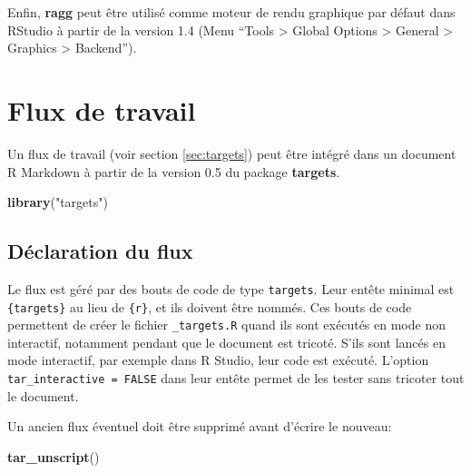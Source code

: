 \documentclass[
  12pt,
  french,
  a4paper,
  extrafontsizes,onecolumn,openright
  ]{memoir}
\newenvironment{Shaded}{\begin{snugshade}}{\end{snugshade}}
\newcommand{\KeywordTok}[1]{\textcolor[rgb]{0.13,0.29,0.53}{\textbf{#1}}}
\newcommand{\NormalTok}[1]{#1}
\newcommand{\StringTok}[1]{\textcolor[rgb]{0.31,0.60,0.02}{#1}}
\begin{document}
\normalsize

Enfin, \textbf{ragg} peut être utilisé comme moteur de rendu graphique par défaut dans RStudio à partir de la version 1.4 (Menu \enquote{Tools \textgreater{} Global Options \textgreater{} General \textgreater{} Graphics \textgreater{} Backend}).

\hypertarget{sec:targetsmd}{%
\section{Flux de travail}\label{sec:targetsmd}}

Un flux de travail (voir section \ref{sec:targets}) peut être intégré dans un document R Markdown à partir de la version 0.5 du package \textbf{targets}.

\scriptsize

\begin{Shaded}
\begin{Highlighting}[]
\KeywordTok{library}\NormalTok{(}\StringTok{"targets"}\NormalTok{)}
\end{Highlighting}
\end{Shaded}

\normalsize

\hypertarget{duxe9claration-du-flux}{%
\subsection{Déclaration du flux}\label{duxe9claration-du-flux}}

Le flux est géré par des bouts de code de type \texttt{targets}.
Leur entête minimal est \texttt{\{targets\}} au lieu de \texttt{\{r\}}, et ils doivent être nommés.
Ces bouts de code permettent de créer le fichier \texttt{\_targets.R} quand ils sont exécutés en mode non interactif, notamment pendant que le document est tricoté.
S'ils sont lancés en mode interactif, par exemple dans R Studio, leur code est exécuté.
L'option \texttt{tar\_interactive\ =\ FALSE} dans leur entête permet de les tester sans tricoter tout le document.

Un ancien flux éventuel doit être supprimé avant d'écrire le nouveau:

\scriptsize

\begin{Shaded}
\begin{Highlighting}[]
\KeywordTok{tar_unscript}\NormalTok{()}
\end{Highlighting}
\end{Shaded}
\end{document}

